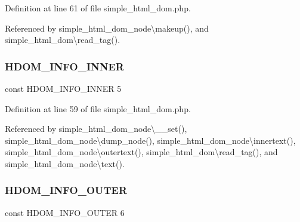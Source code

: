 Definition at line 61 of file simple\+\_\+html\+\_\+dom.\+php.



Referenced by simple\+\_\+html\+\_\+dom\+\_\+node\textbackslash{}makeup(), and simple\+\_\+html\+\_\+dom\textbackslash{}read\+\_\+tag().

\hypertarget{simple__html__dom_8php_ab2b42db1e28668502af838f684ca5577}{}\label{simple__html__dom_8php_ab2b42db1e28668502af838f684ca5577} 
\subsubsection{\texorpdfstring{H\+D\+O\+M\+\_\+\+I\+N\+F\+O\+\_\+\+I\+N\+N\+ER}{HDOM\_INFO\_INNER}}
{\footnotesize\ttfamily const H\+D\+O\+M\+\_\+\+I\+N\+F\+O\+\_\+\+I\+N\+N\+ER 5}



Definition at line 59 of file simple\+\_\+html\+\_\+dom.\+php.



Referenced by simple\+\_\+html\+\_\+dom\+\_\+node\textbackslash{}\+\_\+\+\_\+set(), simple\+\_\+html\+\_\+dom\+\_\+node\textbackslash{}dump\+\_\+node(), simple\+\_\+html\+\_\+dom\+\_\+node\textbackslash{}innertext(), simple\+\_\+html\+\_\+dom\+\_\+node\textbackslash{}outertext(), simple\+\_\+html\+\_\+dom\textbackslash{}read\+\_\+tag(), and simple\+\_\+html\+\_\+dom\+\_\+node\textbackslash{}text().

\hypertarget{simple__html__dom_8php_a9261ef31b846c2545bd838f76d984938}{}\label{simple__html__dom_8php_a9261ef31b846c2545bd838f76d984938} 
\subsubsection{\texorpdfstring{H\+D\+O\+M\+\_\+\+I\+N\+F\+O\+\_\+\+O\+U\+T\+ER}{HDOM\_INFO\_OUTER}}
{\footnotesize\ttfamily const H\+D\+O\+M\+\_\+\+I\+N\+F\+O\+\_\+\+O\+U\+T\+ER 6}



